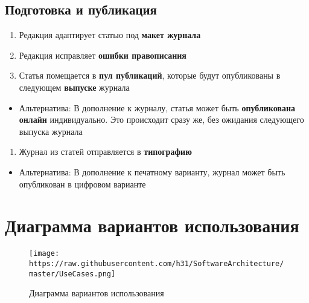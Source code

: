 \subsection{Подготовка и
публикация}\label{ux43fux43eux434ux433ux43eux442ux43eux432ux43aux430-ux438-ux43fux443ux431ux43bux438ux43aux430ux446ux438ux44f}

\begin{enumerate}
\def\labelenumi{\arabic{enumi}.}
\tightlist
\item
  Редакция адаптирует статью под \textbf{макет журнала}
\item
  Редакция исправляет \textbf{ошибки правописания}
\item
  Статья помещается в \textbf{пул публикаций}, которые будут
  опубликованы в следующем \textbf{выпуске} журнала
\end{enumerate}

\begin{itemize}
\tightlist
\item
  Альтернатива: В дополнение к журналу, статья может быть
  \textbf{опубликована онлайн} индивидуально. Это происходит сразу же,
  без ожидания следующего выпуска журнала
\end{itemize}

\begin{enumerate}
\def\labelenumi{\arabic{enumi}.}
\setcounter{enumi}{3}
\tightlist
\item
  Журнал из статей отправляется в \textbf{типографию}
\end{enumerate}

\begin{itemize}
\tightlist
\item
  Альтернатива: В дополнение к печатному варианту, журнал может быть
  опубликован в цифровом варианте
\end{itemize}

\section{Диаграмма вариантов
использования}\label{ux434ux438ux430ux433ux440ux430ux43cux43cux430-ux432ux430ux440ux438ux430ux43dux442ux43eux432-ux438ux441ux43fux43eux43bux44cux437ux43eux432ux430ux43dux438ux44f}

\begin{figure}[htbp]
\centering
\texttt{[image: https://raw.githubusercontent.com/h31/SoftwareArchitecture/master/UseCases.png]}
\caption{Диаграмма вариантов использования}
\end{figure}

